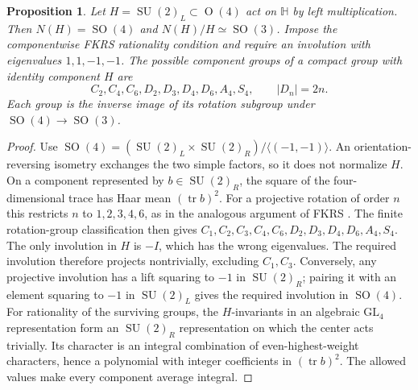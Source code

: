 \documentclass[11pt]{article}
\DeclareMathOperator{\SO}{SO}
\DeclareMathOperator{\SU}{SU}
\newtheorem{proposition}{Proposition}
\begin{document}
\begin{proposition}
Let $H=\SU(2)_L\subset\operatorname O(4)$ act on $\mathbb H$ by left
multiplication. Then $N(H)=\SO(4)$ and $N(H)/H\simeq\SO(3)$.
Impose the componentwise FKRS rationality condition and require an involution
with eigenvalues $1,1,-1,-1$. The possible component groups of a compact group
with identity component $H$ are
\[
 C_2,C_4,C_6,D_2,D_3,D_4,D_6,A_4,S_4,\qquad |D_n|=2n.
\]
Each group is the inverse image of its rotation subgroup under
$\SO(4)\to\SO(3)$.
\end{proposition}
\begin{proof}
Use $\SO(4)=(\SU(2)_L\times\SU(2)_R)/\langle(-1,-1)\rangle$.
An orientation-reversing isometry exchanges the two simple factors, so it
does not normalize $H$. On a component represented by $b\in\SU(2)_R$,
the square of the four-dimensional trace has Haar mean $(\operatorname{tr}b)^2$.
For a projective rotation of order $n$ this restricts $n$ to $1,2,3,4,6$,
as in the analogous argument of FKRS \cite[Section 3.4]{fkrs}.
The finite rotation-group classification then gives
$C_1,C_2,C_3,C_4,C_6,D_2,D_3,D_4,D_6,A_4,S_4$.
The only involution in $H$ is $-I$, which has the wrong eigenvalues.
The required involution therefore projects nontrivially, excluding $C_1,C_3$.
Conversely, any projective involution has a lift squaring to $-1$ in
$\SU(2)_R$; pairing it with an element squaring to $-1$ in $\SU(2)_L$ gives
the required involution in $\SO(4)$.
For rationality of the surviving groups, the $H$-invariants in an algebraic
$\mathrm{GL}_4$ representation form an $\SU(2)_R$ representation on which
the center acts trivially. Its character is an integral combination of
even-highest-weight characters, hence a polynomial with integer coefficients
in $(\operatorname{tr}b)^2$. The allowed values make every component average
integral.
\end{proof}
\end{document}

